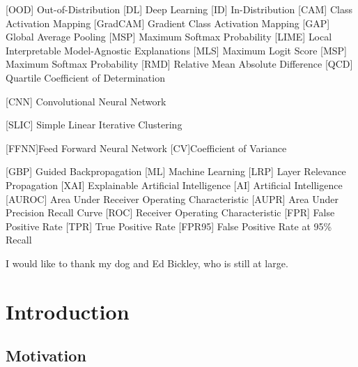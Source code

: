 \documentclass[UKenglish]{uiomasterthesis} %
\theoremstyle{definition}
\begin{document}
\begin{acronym}[ICANN]
       [OOD]   {Out-of-Distribution}
       [DL]   {Deep Learning}
     [ID] {In-Distribution}
     [CAM] {Class Activation Mapping}
     [GradCAM] {Gradient Class Activation Mapping}
       [GAP]   {Global Average Pooling}
       [MSP]   {Maximum Softmax Probability}
       [LIME]   {Local Interpretable Model-Agnostic Explanations}
       [MLS]   {Maximum Logit Score}
       [MSP]   {Maximum Softmax Probability}
       [RMD]   {Relative Mean Absolute Difference}
       [QCD]   {Quartile Coefficient of Determination}

       [CNN]   {Convolutional Neural Network}

     [SLIC] {Simple Linear Iterative Clustering}

    [FFNN]{Feed Forward Neural Network}
    [CV]{Coefficient of Variance}

       [GBP]   {Guided Backpropagation}
       [ML]   {Machine Learning}
       [LRP]   {Layer Relevance Propagation}
       [XAI]   {Explainable Artificial Intelligence}
       [AI]   {Artificial Intelligence}
       [AUROC]   {Area Under Receiver Operating Characteristic}
       [AUPR]   {Area Under Precision Recall Curve}
       [ROC]   {Receiver Operating Characteristic}
       [FPR]   {False Positive Rate}
       [TPR]   {True Positive Rate}
       [FPR95]   {False Positive Rate at 95\% Recall}
\end{acronym}

\begin{preface}
I would like to thank my dog and Ed Bickley, who is still at large.
\end{preface}

\mainmatter{}



\chapter{Introduction}

\section{Motivation}
\end{document}
